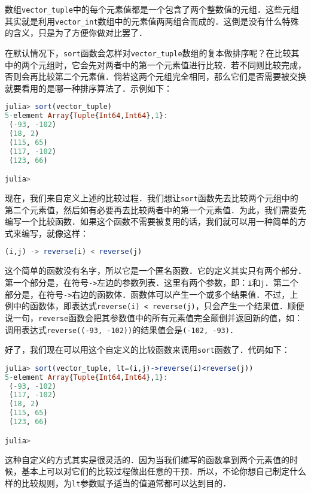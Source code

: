 数组\verb|vector_tuple|中的每个元素值都是一个包含了两个整数值的元组．这些元组其实就是利用\verb|vector_int|数组中的元素值两两组合而成的．这倒是没有什么特殊的含义，只是为了方便你做对比罢了．

在默认情况下，\verb|sort|函数会怎样对\verb|vector_tuple|数组的复本做排序呢？在比较其中的两个元组时，它会先对两者中的第一个元素值进行比较．若不同则比较完成，否则会再比较第二个元素值．倘若这两个元组完全相同，那么它们是否需要被交换就要看用的是哪一种排序算法了．示例如下：

\begin{lstlisting}[language=julia]
julia> sort(vector_tuple)
5-element Array{Tuple{Int64,Int64},1}:
 (-93, -102)
 (18, 2)    
 (115, 65)  
 (117, -102)
 (123, 66)  

julia> 
\end{lstlisting}

现在，我们来自定义上述的比较过程．我们想让\verb|sort|函数先去比较两个元组中的第二个元素值，然后如有必要再去比较两者中的第一个元素值．为此，我们需要先编写一个比较函数．如果这个函数不需要被复用的话，我们就可以用一种简单的方式来编写，就像这样：

\begin{lstlisting}[language=julia]
(i,j) -> reverse(i) < reverse(j)
\end{lstlisting}

这个简单的函数没有名字，所以它是一个匿名函数．它的定义其实只有两个部分．第一个部分是，在符号\verb|->|左边的参数列表．这里有两个参数，即：\verb|i|和\verb|j|．第二个部分是，在符号\verb|->|右边的函数体．函数体可以产生一个或多个结果值．不过，上例中的函数体，即表达式\verb|reverse(i) < reverse(j)|，只会产生一个结果值．顺便说一句，\verb|reverse|函数会把其参数值中的所有元素值完全颠倒并返回新的值，如：调用表达式\verb|reverse((-93, -102))|的结果值会是\verb|(-102, -93)|．

好了，我们现在可以用这个自定义的比较函数来调用\verb|sort|函数了．代码如下：

\begin{lstlisting}[language=julia]
julia> sort(vector_tuple, lt=(i,j)->reverse(i)<reverse(j))
5-element Array{Tuple{Int64,Int64},1}:
 (-93, -102)
 (117, -102)
 (18, 2)    
 (115, 65)  
 (123, 66)  

julia> 
\end{lstlisting}

这种自定义的方式其实是很灵活的．因为当我们编写的函数拿到两个元素值的时候，基本上可以对它们的比较过程做出任意的干预．所以，不论你想自己制定什么样的比较规则，为\verb|lt|参数赋予适当的值通常都可以达到目的．


